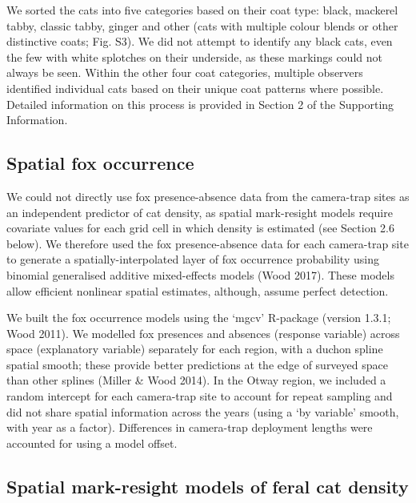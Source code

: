 \documentclass[]{elsarticle} %
\begin{document}
We sorted the cats into five categories based on their coat type: black, mackerel tabby, classic tabby, ginger and other (cats with multiple colour blends or other distinctive coats; Fig. S3). We did not attempt to identify any black cats, even the few with white splotches on their underside, as these markings could not always be seen. Within the other four coat categories, multiple observers identified individual cats based on their unique coat patterns where possible. Detailed information on this process is provided in Section 2 of the Supporting Information.

\hypertarget{spatial-fox-occurrence}{%
\subsection{Spatial fox occurrence}\label{spatial-fox-occurrence}}

We could not directly use fox presence-absence data from the camera-trap sites as an independent predictor of cat density, as spatial mark-resight models require covariate values for each grid cell in which density is estimated (see Section 2.6 below). We therefore used the fox presence-absence data for each camera-trap site to generate a spatially-interpolated layer of fox occurrence probability using binomial generalised additive mixed-effects models (Wood 2017). These models allow efficient nonlinear spatial estimates, although, assume perfect detection.

We built the fox occurrence models using the `mgcv' R-package (version 1.3.1; Wood 2011). We modelled fox presences and absences (response variable) across space (explanatory variable) separately for each region, with a duchon spline spatial smooth; these provide better predictions at the edge of surveyed space than other splines (Miller \& Wood 2014). In the Otway region, we included a random intercept for each camera-trap site to account for repeat sampling and did not share spatial information across the years (using a `by variable' smooth, with year as a factor). Differences in camera-trap deployment lengths were accounted for using a model offset.

\hypertarget{spatial-mark-resight-models-of-feral-cat-density}{%
\subsection{Spatial mark-resight models of feral cat density}\label{spatial-mark-resight-models-of-feral-cat-density}}
\end{document}
